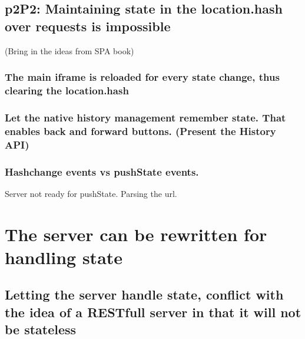 \documentclass[english]{ifimaster}
\begin{document}
\subsection{p2P2: Maintaining state in the location.hash over requests is impossible}
(Bring in the ideas from SPA book)
\subsubsection{The main iframe is reloaded for every state change, thus clearing the location.hash}
\subsubsection{Let the native history management remember state. That enables back and forward buttons. (Present the History API)}



\subsubsection{Hashchange events vs pushState events.}
 Server not ready for pushState. Parsing the url. 


\section{The server can be rewritten for handling state}
\subsection{Letting the server handle state, conflict with the idea of a RESTfull server in that it will not be stateless}
\end{document}
